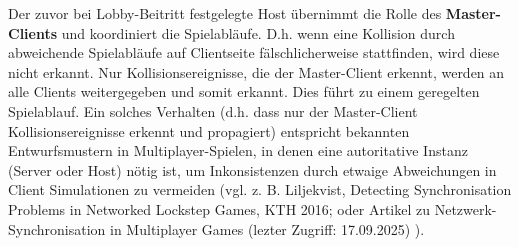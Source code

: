 Der zuvor bei Lobby-Beitritt festgelegte Host übernimmt die Rolle des \textbf{Master-Clients} und koordiniert die Spielabläufe.
D.h. wenn eine Kollision durch abweichende Spielabläufe auf Clientseite fälschlicherweise stattfinden, wird diese nicht erkannt. 
Nur Kollisionsereignisse, die der Master-Client erkennt, werden an alle Clients weitergegeben und somit erkannt. Dies führt zu einem geregelten Spielablauf.
Ein solches Verhalten (d.h. dass nur der Master-Client Kollisionsereignisse erkennt und propagiert) entspricht bekannten Entwurfsmustern in Multiplayer-Spielen, in denen eine autoritative Instanz (Server oder Host) nötig ist, 
um Inkonsistenzen durch etwaige Abweichungen in Client Simulationen zu vermeiden (vgl. z. B. Liljekvist, Detecting Synchronisation Problems in Networked Lockstep Games, KTH 2016; oder Artikel zu Netzwerk-Synchronisation in Multiplayer Games (lezter Zugriff: 17.09.2025) ).
